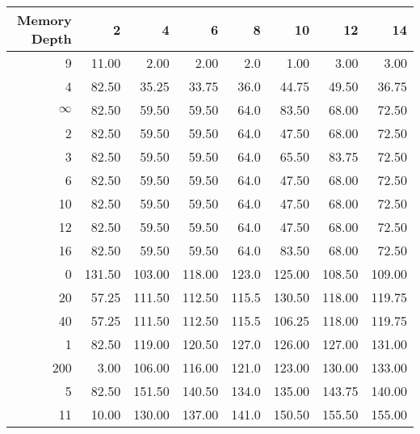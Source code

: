 \begin{tabular}{rrrrrrrr}
\toprule
 Memory Depth &       2 &       4 &       6 &      8 &      10 &      12 &      14 \\
\midrule
            9 &   11.00 &    2.00 &    2.00 &    2.0 &    1.00 &    3.00 &    3.00 \\
            4 &   82.50 &   35.25 &   33.75 &   36.0 &   44.75 &   49.50 &   36.75 \\
           $\infty$ &   82.50 &   59.50 &   59.50 &   64.0 &   83.50 &   68.00 &   72.50 \\
            2 &   82.50 &   59.50 &   59.50 &   64.0 &   47.50 &   68.00 &   72.50 \\
            3 &   82.50 &   59.50 &   59.50 &   64.0 &   65.50 &   83.75 &   72.50 \\
            6 &   82.50 &   59.50 &   59.50 &   64.0 &   47.50 &   68.00 &   72.50 \\
           10 &   82.50 &   59.50 &   59.50 &   64.0 &   47.50 &   68.00 &   72.50 \\
           12 &   82.50 &   59.50 &   59.50 &   64.0 &   47.50 &   68.00 &   72.50 \\
           16 &   82.50 &   59.50 &   59.50 &   64.0 &   83.50 &   68.00 &   72.50 \\
            0 &  131.50 &  103.00 &  118.00 &  123.0 &  125.00 &  108.50 &  109.00 \\
           20 &   57.25 &  111.50 &  112.50 &  115.5 &  130.50 &  118.00 &  119.75 \\
           40 &   57.25 &  111.50 &  112.50 &  115.5 &  106.25 &  118.00 &  119.75 \\
            1 &   82.50 &  119.00 &  120.50 &  127.0 &  126.00 &  127.00 &  131.00 \\
          200 &    3.00 &  106.00 &  116.00 &  121.0 &  123.00 &  130.00 &  133.00 \\
            5 &   82.50 &  151.50 &  140.50 &  134.0 &  135.00 &  143.75 &  140.00 \\
           11 &   10.00 &  130.00 &  137.00 &  141.0 &  150.50 &  155.50 &  155.00 \\
\bottomrule
\end{tabular}
